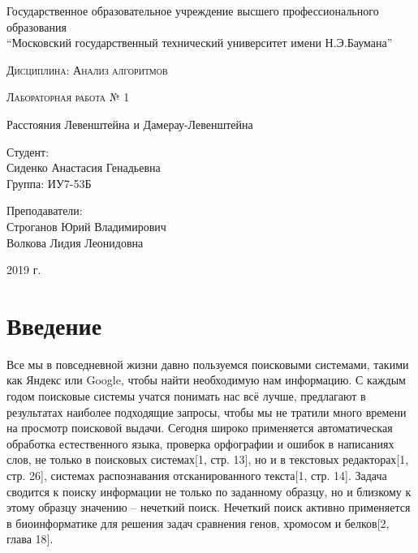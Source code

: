 \documentclass[a4paper,14pt]{article} %
\newcommand{\anonsection}[1]{\section*{#1}\addcontentsline{toc}{section}{#1}}
\begin{document}
	\begin{titlepage}

       		\begin{center}
         		\large
		
        			Государственное образовательное учреждение высшего профессионального образования\\
       			“Московский государственный технический университет имени Н.Э.Баумана”
         		\vspace{3cm}
            
            		\textsc{Дисциплина: Анализ алгоритмов}
           		\vspace{0.5cm}
                
            		\textsc{Лабораторная работа № 1}
           		 \vspace{3cm}
            
           		 \LARGE 
		 
		 	Расстояния Левенштейна и Дамерау-Левенштейна
           		 \vspace{3cm}
            
            		\begin{flushright}
            			Студент: \\
				Сиденко Анастасия Генадьевна \\   
            			Группа: ИУ7-53Б \\
           			\hfill
            
           			Преподаватели: \\
				Строганов Юрий Владимирович \\
           			Волкова Лидия Леонидовна
            			\vfill
            		\end{flushright}
		
			\large
            		2019 г.
		\end{center}

	\end{titlepage}
    
	\tableofcontents
	
	\newpage
    
	\anonsection{Введение}
	\hfill
	
	Все мы в повседневной жизни давно пользуемся поисковыми системами, такими как Яндекс или Google, чтобы найти необходимую нам информацию. С каждым годом поисковые системы учатся понимать нас всё лучше, предлагают в результатах наиболее подходящие запросы, чтобы мы не тратили много времени на просмотр поисковой выдачи.
	Сегодня широко применяется автоматическая обработка естественного языка, проверка орфографии и ошибок в написаниях слов, не только в поисковых системах[1, стр. 13], но и в текстовых редакторах[1, стр. 26], системах распознавания отсканированного текста[1, стр. 14]. Задача сводится к поиску информации не только по заданному образцу, но и близкому к этому образцу значению -- нечеткий поиск. Нечеткий поиск активно применяется в биоинформатике для решения задач сравнения генов, хромосом и белков[2, глава 18].
        
\end{document}
